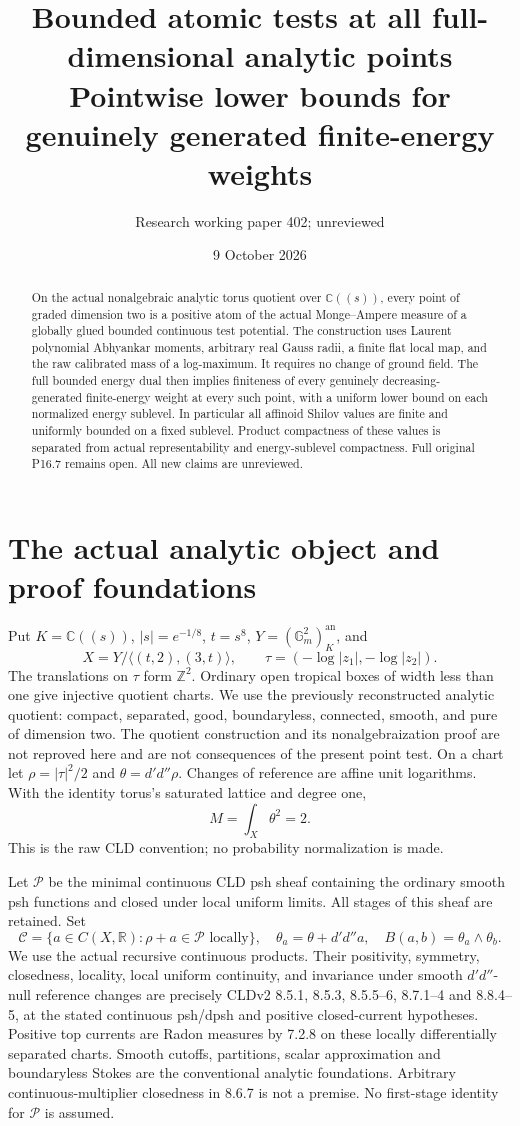 \documentclass[11pt]{article}
\title{Bounded atomic tests at all full-dimensional analytic points\\
Pointwise lower bounds for genuinely generated finite-energy weights}
\author{Research working paper 402; unreviewed}
\date{9 October 2026}
\newcommand{\DD}{d'd''}
\newcommand{\C}{\mathcal C}
\newcommand{\RR}{\mathbb R}
\theoremstyle{remark}\newtheorem{remark}[theorem]{Remark}
\begin{document}
\maketitle
\begin{abstract}
On the actual nonalgebraic analytic torus quotient over
$\mathbb C((s))$, every point of graded dimension two is a positive
atom of the actual Monge--Ampere measure of a globally glued bounded
continuous test potential. The construction uses Laurent polynomial
Abhyankar moments, arbitrary real Gauss radii, a finite flat local
map, and the raw calibrated mass of a log-maximum. It requires no
change of ground field. The full bounded energy dual then implies
finiteness of every genuinely decreasing-generated finite-energy
weight at every such point, with a uniform lower bound on each
normalized energy sublevel. In particular all affinoid Shilov values
are finite and uniformly bounded on a fixed sublevel. Product
compactness of these values is separated from actual
representability and energy-sublevel compactness. Full original
P16.7 remains open. All new claims are unreviewed.
\end{abstract}

\section{The actual analytic object and proof foundations}
Put $K=\mathbb C((s))$, $|s|=e^{-1/8}$, $t=s^8$,
$Y=(\mathbb G_m^2)^{\mathrm{an}}_K$, and
\[
 X=Y/\langle(t,2),(3,t)\rangle,\qquad
 \tau=(-\log|z_1|,-\log|z_2|).
\]
The translations on $\tau$ form $\mathbb Z^2$. Ordinary open tropical
boxes of width less than one give injective quotient charts. We use
the previously reconstructed analytic quotient: compact, separated,
good, boundaryless, connected, smooth, and pure of dimension two.
The quotient construction and its nonalgebraization proof are not
reproved here and are not consequences of the present point test.
On a chart let $\rho=|\tau|^2/2$ and $\theta=\DD\rho$.
Changes of reference are affine unit logarithms. With the identity
torus's saturated lattice and degree one,
\[
 M=\int_X\theta^2=2.
\]
This is the raw CLD convention; no probability normalization is made.

Let $\mathscr P$ be the minimal continuous CLD psh sheaf containing
the ordinary smooth psh functions and closed under local uniform
limits. All stages of this sheaf are retained. Set
\[
 \C=\{a\in C(X,\RR):\rho+a\in\mathscr P\text{ locally}\},\quad
 \theta_a=\theta+\DD a,\quad B(a,b)=\theta_a\wedge\theta_b.
\]
We use the actual recursive continuous products. Their positivity,
symmetry, closedness, locality, local uniform continuity, and
invariance under smooth $\DD$-null reference changes are precisely
CLDv2 8.5.1, 8.5.3, 8.5.5--6, 8.7.1--4 and 8.8.4--5, at the stated
continuous psh/dpsh and positive closed-current hypotheses. Positive
top currents are Radon measures by 7.2.8 on these locally
differentially separated charts. Smooth cutoffs, partitions, scalar
approximation and boundaryless Stokes are the conventional analytic
foundations. Arbitrary continuous-multiplier closedness in 8.6.7 is
not a premise. No first-stage identity for $\mathscr P$ is assumed.
\end{document}
